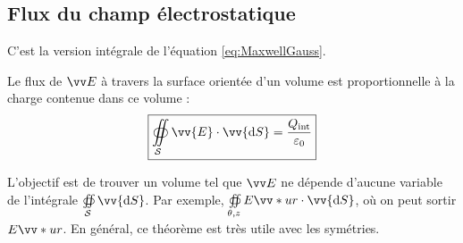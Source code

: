 \documentclass[11pt,a4paper,fleqn,pdftex]{report}
\begin{document}
\subsection{Flux du champ électrostatique}
\begin{itheorem}
C'est la version intégrale de l'équation \eqref{eq:MaxwellGauss}. \par
Le flux de $\E{}$ à travers la surface orientée d'un volume est proportionnelle à la charge contenue dans ce volume :
\begin{equation}\label{MaxwellGauss}
\boxed{\oiint \limits_\mathcal{S} \vv{E} \cdot \vv{\d S} = \dfrac{Q_{\text{int}}}{\varepsilon_0}}
\end{equation}\par
L'objectif est de trouver un volume tel que $\E{}$ ne dépende d'aucune variable de l'intégrale $\oiint \limits_\mathcal{S} \vv{\d S}$. Par exemple, $\oiint \limits_{\mathclap{\theta , z}} E\vv*{u}{r} \cdot \vv{\d S}$, où on peut sortir $E\vv*{u}{r}$. En général, ce théorème est très utile avec les symétries.
\end{itheorem}
%
\end{document}
